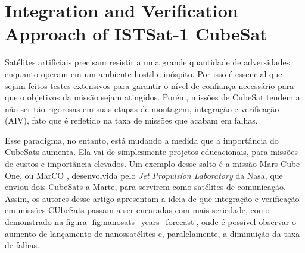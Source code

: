 


\section{Integration and Verification Approach of ISTSat-1 CubeSat \\ \cite{aiv-cubesat}}
\label{aiv-cubesat}
Satélites artificiais precisam resistir a uma grande quantidade de adversidades enquanto operam em um ambiente hostil e inóspito. Por isso é essencial que sejam feitos testes extensivos para garantir o nível de confiança necessário para que o objetivos da missão sejam atingidos. Porém, missões de CubeSat tendem a não ser tão rigorosas em suas etapas de montagem, integração e verificação (AIV), fato que é refletido na taxa de missões que acabam em falhas.

Esse paradigma, no entanto, está mudando a medida que a importância do CubeSats aumenta. Ela vai de simplesmente projetos educacionais, para missões de custos e importância elevados. Um exemplo desse salto é a missão Mars Cube One, ou MarCO \cite{mars-cubesat}, desenvolvida pelo \textit{Jet Propulsion Laboratory} da Nasa, que enviou dois CubeSats a Marte, para servirem como satélites de comunicação. Assim, os autores desse artigo apresentam a ideia de que integração e verificação em missões CUbeSats passam a ser encaradas com mais seriedade, como demonstrado na figura \ref{fig:nanosats_years_forecast}, onde é possível observar o aumento de lançamento de nanossatélites e, paralelamente, a diminuição da taxa de falhas.

